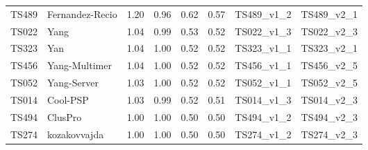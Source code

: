 \begin{table}[ht]
{\begin{tabular}{llllllll}
TS489 & Fernandez-Recio & 1.20 & 0.96 & 0.62 & 0.57 & TS489\_v1\_2 & TS489\_v2\_1 \\ 
TS022 & Yang & 1.04 & 0.99 & 0.53 & 0.52 & TS022\_v1\_3 & TS022\_v2\_3 \\ 
TS323 & Yan & 1.04 & 1.00 & 0.52 & 0.52 & TS323\_v1\_1 & TS323\_v2\_1 \\ 
TS456 & Yang-Multimer & 1.04 & 1.00 & 0.52 & 0.52 & TS456\_v1\_1 & TS456\_v2\_5 \\ 
TS052 & Yang-Server & 1.03 & 1.00 & 0.52 & 0.52 & TS052\_v1\_1 & TS052\_v2\_5 \\ 
TS014 & Cool-PSP & 1.03 & 0.99 & 0.52 & 0.51 & TS014\_v1\_3 & TS014\_v2\_3 \\ 
TS494 & ClusPro & 1.00 & 1.00 & 0.50 & 0.50 & TS494\_v1\_2 & TS494\_v2\_3 \\ 
TS274 & kozakovvajda & 1.00 & 1.00 & 0.50 & 0.50 & TS274\_v1\_2 & TS274\_v2\_3 \\ 
\bottomrule
\end{tabular}%
}
\end{table}
